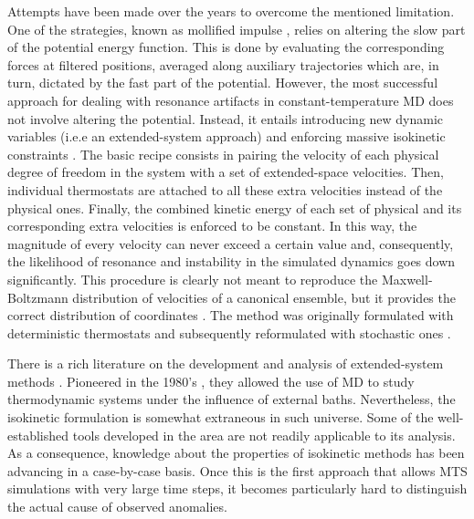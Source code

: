 \documentclass[
aip,
jcp,
reprint,
]{revtex4-1}
\begin{document}
Attempts have been made over the years to overcome the mentioned limitation.
One of the strategies, known as mollified impulse \cite{Garcia-archilla_1998, Skeel_1999}, relies on altering the slow part of the potential energy function.
This is done by evaluating the corresponding forces at filtered positions, averaged along auxiliary trajectories which are, in turn, dictated by the fast part of the potential.
However, the most successful approach for dealing with resonance artifacts in constant-temperature MD does not involve altering the potential.
Instead, it entails introducing new dynamic variables (i.e.e an extended-system approach) and enforcing massive isokinetic constraints \cite{Minary_2003a, Minary_2003b, Minary_2004, Leimkuhler_2013}.
The basic recipe consists in pairing the velocity of each physical degree of freedom in the system with a set of extended-space velocities.
Then, individual thermostats are attached to all these extra velocities instead of the physical ones.
Finally, the combined kinetic energy of each set of physical and its corresponding extra velocities is enforced to be constant.
In this way, the magnitude of every velocity can never exceed a certain value and, consequently, the likelihood of resonance and instability in the simulated dynamics goes down significantly.
This procedure is clearly not meant to reproduce the Maxwell-Boltzmann distribution of velocities of a canonical ensemble, but it provides the correct distribution of coordinates \cite{Minary_2003a, Minary_2003b, Minary_2004, Leimkuhler_2013}.
The method was originally formulated \cite{Minary_2003a, Minary_2003b, Minary_2004} with deterministic thermostats \cite{Martyna_1992} and subsequently reformulated \cite{Leimkuhler_2013} with stochastic ones \cite{Samoletov_2007, Leimkuhler_2009}.

There is a rich literature on the development and analysis of extended-system methods \cite{Martyna_1996, Tuckerman_1999, Tuckerman_2001a, Sergi_2001, Ezra_2004, Tuckerman_2010}.
Pioneered in the 1980's \cite{Andersen_1980, Nose_1984, Hoover_1985}, they allowed the use of MD to study thermodynamic systems under the influence of external baths.
Nevertheless, the isokinetic formulation is somewhat extraneous in such universe.
Some of the well-established tools developed in the area are not readily applicable to its analysis.
As a consequence, knowledge about the properties of isokinetic methods has been advancing in a case-by-case basis.
Once this is the first approach that allows MTS simulations with very large time steps, it becomes particularly hard to distinguish the actual cause of observed anomalies.
\end{document}
